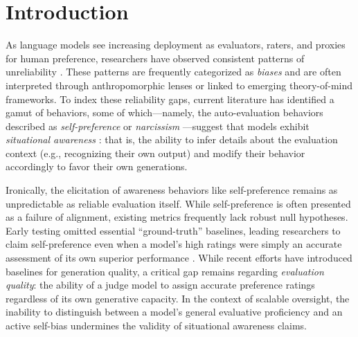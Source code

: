 \documentclass{article}
\theoremstyle{plain}
\theoremstyle{definition}
\theoremstyle{remark}
\begin{document}
\printAffiliationsAndNotice{\icmlEqualContribution}

\begin{abstract}
  This document provides a basic paper template and submission guidelines.
  Abstracts must be a single paragraph, ideally between 4--6 sentences long.
  Gross violations will trigger corrections at the camera-ready phase.
\end{abstract}
\section{Introduction}

As language models see increasing deployment as evaluators, raters, and proxies for human preference, researchers have observed consistent patterns of unreliability \cite{guSurveyLLMasaJudge2025,liLLMsasJudgesComprehensiveSurvey2024}. These patterns are frequently categorized as \textit{biases} \cite{dietzLLMEvaluationTropesPerspectives2025,yeJusticePrejudiceQuantifying2024} and are often interpreted through anthropomorphic lenses or linked to emerging theory-of-mind frameworks. To index these reliability gaps, current literature has identified a gamut of behaviors, some of which---namely, the auto-evaluation behaviors described as \textit{self-preference} \cite{panicksseryLLMEvaluatorsRecognize2024} or \textit{narcissism} \cite{liuLLMsNarcissisticEvaluators2024}---suggest that models exhibit \textit{situational awareness} \cite{laineSituationalAwarenessBenchmark2023}: that is, the ability to infer details about the evaluation context (e.g., recognizing their own output) and modify their behavior accordingly to favor their own generations.

Ironically, the elicitation of awareness behaviors like self-preference remains as unpredictable as reliable evaluation itself. While self-preference is often presented as a failure of alignment, existing metrics frequently lack robust null hypotheses. Early testing omitted essential ``ground-truth'' baselines, leading researchers to claim self-preference even when a model’s high ratings were simply an accurate assessment of its own superior performance \cite{chenLLMEvaluatorsPrefer2025,wataokaSelfPreferenceBiasLLMasaJudge2025}. While recent efforts have introduced baselines for generation quality, a critical gap remains regarding \textit{evaluation quality}: the ability of a judge model to assign accurate preference ratings regardless of its own generative capacity. In the context of scalable oversight, the inability to distinguish between a model's general evaluative proficiency and an active self-bias undermines the validity of situational awareness claims.
\end{document}
